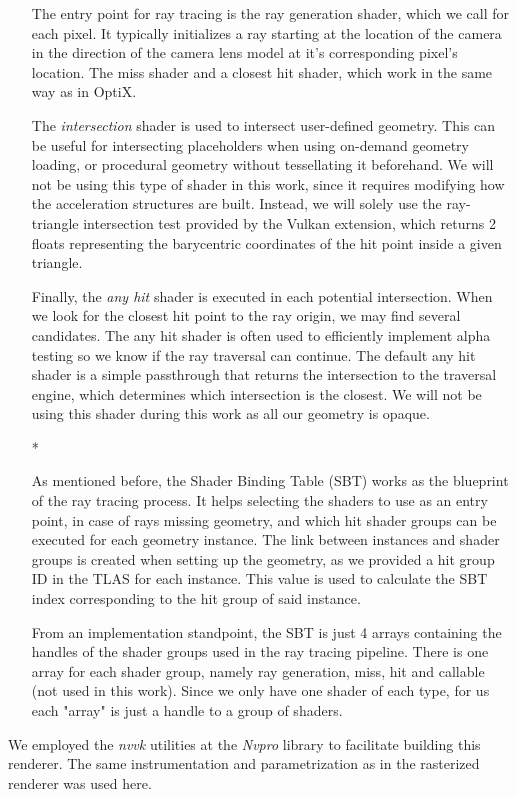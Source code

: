 \begin{itemize}
{    The entry point for ray tracing is the ray generation shader, which we call for each pixel. It typically initializes a ray starting at the location of the camera in the direction of the camera lens model at it's corresponding pixel's location. The miss shader and a closest hit shader, which work in the same way as in OptiX.

    The \textit{intersection} shader is used to intersect user-defined geometry. This can be useful for intersecting placeholders when using on-demand geometry loading, or procedural geometry without tessellating it beforehand. We will not be using this type of shader in this work, since it requires modifying how the acceleration structures are built. Instead, we will solely use the ray-triangle intersection test provided by the Vulkan extension, which returns 2 floats representing the barycentric coordinates of the hit point inside a given triangle.

    Finally, the \textit{any hit} shader is executed in each potential intersection. When we look for the closest hit point to the ray origin, we may find several candidates. The any hit shader is often used to efficiently implement alpha testing so we know if the ray traversal can continue. The default any hit shader is a simple passthrough that returns the intersection to the traversal engine, which determines which intersection is the closest. We will not be using this shader during this work as all our geometry is opaque.}
  \item[*]{As mentioned before, the Shader Binding Table (SBT) works as the blueprint of the ray tracing process. It helps selecting the shaders to use as an entry point, in case of rays missing geometry, and which hit shader groups can be executed for each geometry instance. The link between instances and shader groups is created when setting up the geometry, as we provided a hit group ID in the TLAS for each instance. This value is used to calculate the SBT index corresponding to the hit group of said instance.

    From an implementation standpoint, the SBT is just 4 arrays containing the handles of the shader groups used in the ray tracing pipeline. There is one array for each shader group, namely ray generation, miss, hit and callable (not used in this work). Since we only have one shader of each type, for us each "array" is just a handle to a group of shaders.}
\end{itemize}

We employed the \textit{nvvk} utilities at the \textit{Nvpro} library \cite{Nvpro} to facilitate building this renderer. The same instrumentation and parametrization as in the rasterized renderer was used here.

